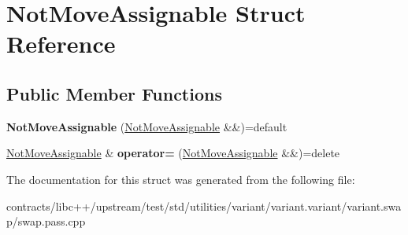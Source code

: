 \hypertarget{struct_not_move_assignable}{}\section{Not\+Move\+Assignable Struct Reference}
\label{struct_not_move_assignable}
\subsection*{Public Member Functions}
\begin{DoxyCompactItemize}
\item 
\mbox{\label{struct_not_move_assignable_aeff8b11238095d33945f85424d472071}} 
{\bfseries Not\+Move\+Assignable} (\mbox{\hyperlink{struct_not_move_assignable}{Not\+Move\+Assignable}} \&\&)=default
\item 
\mbox{\label{struct_not_move_assignable_a6e749e9e18bf5cc2eefb9d9fbd6f5273}} 
\mbox{\hyperlink{struct_not_move_assignable}{Not\+Move\+Assignable}} \& {\bfseries operator=} (\mbox{\hyperlink{struct_not_move_assignable}{Not\+Move\+Assignable}} \&\&)=delete
\end{DoxyCompactItemize}


The documentation for this struct was generated from the following file\+:\begin{DoxyCompactItemize}
\item 
contracts/libc++/upstream/test/std/utilities/variant/variant.\+variant/variant.\+swap/swap.\+pass.\+cpp\end{DoxyCompactItemize}
